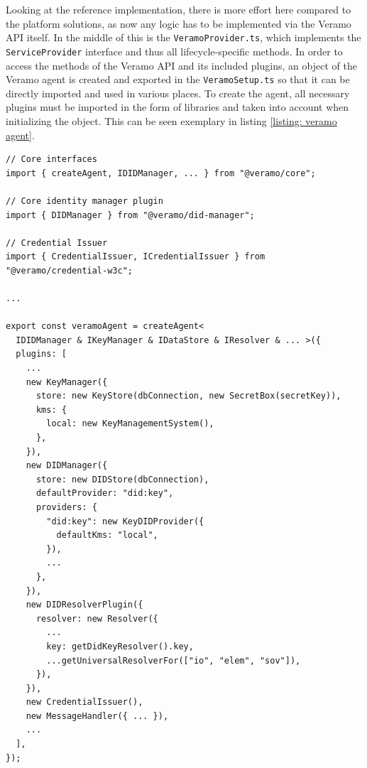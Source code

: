     Looking at the reference implementation, there is more effort here compared to the platform solutions, as now any logic has to be implemented via the Veramo API itself. In the middle of this is the \texttt{VeramoProvider.ts}, which implements the \texttt{ServiceProvider} interface and thus all lifecycle-specific methods. In order to access the methods of the Veramo API and its included plugins, an object of the Veramo agent is created and exported in the \texttt{VeramoSetup.ts} so that it can be directly imported and used in various places. To create the agent, all necessary plugins must be imported in the form of libraries and taken into account when initializing the object. This can be seen exemplary in listing \ref{listing: veramo agent}. 
    \newline
    \begin{lstlisting}[style=ES6, caption=Veramo agent creation, label={listing: veramo agent}]
// Core interfaces
import { createAgent, IDIDManager, ... } from "@veramo/core";

// Core identity manager plugin
import { DIDManager } from "@veramo/did-manager";

// Credential Issuer
import { CredentialIssuer, ICredentialIssuer } from "@veramo/credential-w3c";

...

export const veramoAgent = createAgent<
  IDIDManager & IKeyManager & IDataStore & IResolver & ... >({
  plugins: [
    ...
    new KeyManager({
      store: new KeyStore(dbConnection, new SecretBox(secretKey)),
      kms: {
        local: new KeyManagementSystem(),
      },
    }),
    new DIDManager({
      store: new DIDStore(dbConnection),
      defaultProvider: "did:key",
      providers: {
        "did:key": new KeyDIDProvider({
          defaultKms: "local",
        }),
        ...
      },
    }),
    new DIDResolverPlugin({
      resolver: new Resolver({
        ...
        key: getDidKeyResolver().key,
        ...getUniversalResolverFor(["io", "elem", "sov"]),
      }),
    }),
    new CredentialIssuer(),
    new MessageHandler({ ... }),
    ...
  ],
});\end{lstlisting}
    
